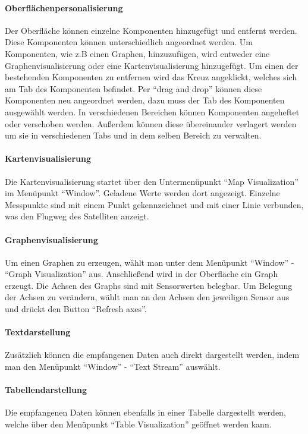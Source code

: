 \paragraph{Oberflächenpersonalisierung}
Der Oberfläche können einzelne Komponenten hinzugefügt und entfernt werden. Diese Komponenten können unterschiedlich angeordnet werden. Um Komponenten, wie z.B einen Graphen, hinzuzufügen, wird entweder eine Graphenvisualisierung oder eine Kartenvisualisierung hinzugefügt. Um einen der bestehenden Komponenten zu entfernen wird das Kreuz angeklickt, welches sich am Tab des Komponenten befindet. Per ``drag and drop''  können diese Komponenten neu angeordnet werden, dazu muss der Tab des Komponenten ausgewählt werden. In verschiedenen Bereichen können Komponenten angeheftet oder verschoben werden. Außerdem können diese übereinander verlagert werden um sie in verschiedenen Tabs und in dem selben Bereich zu verwalten.
\paragraph{Kartenvisualisierung}
Die Kartenvisualisierung startet über den Untermenüpunkt ``Map Visualization'' im Menüpunkt ``Window''. Geladene Werte werden dort angezeigt. Einzelne Messpunkte sind mit einem Punkt gekennzeichnet und mit einer Linie verbunden, was den Flugweg des Satelliten anzeigt.
\paragraph{Graphenvisualisierung}
Um einen Graphen zu erzeugen, wählt man unter dem Menüpunkt ``Window'' - ``Graph Visualization'' aus. Anschließend wird in der Oberfläche ein Graph erzeugt. Die Achsen des Graphs sind mit Sensorwerten belegbar. Um Belegung der Achsen zu verändern, wählt man an den Achsen den jeweiligen Sensor aus und drückt den Button ``Refresh axes''.

\paragraph{Textdarstellung}
Zusätzlich können die empfangenen Daten auch direkt dargestellt werden, indem man den Menüpunkt ``Window'' - ``Text Stream'' auswählt.

\paragraph {Tabellendarstellung}
Die empfangenen Daten können ebenfalls in einer Tabelle dargestellt werden, welche über den Menüpunkt ``Table Visualization'' geöffnet werden kann.

